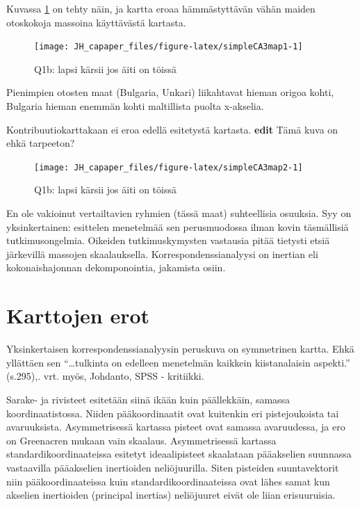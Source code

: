 \documentclass[
  finnish,
]{book}
\begin{document}
Kuvassa \ref{fig:simpleCA3map1} on tehty näin, ja kartta eroaa hämmästyttävän
vähän maiden otoskokoja massoina käyttävästä kartasta.

\begin{figure}

{\centering \texttt{[image: JH\_capaper\_files/figure-latex/simpleCA3map1-1]} 

}

\caption{Q1b: lapsi kärsii jos äiti on töissä}\label{fig:simpleCA3map1}
\end{figure}

Pienimpien otosten maat (Bulgaria, Unkari) liikahtavat hieman origoa kohti,
Bulgaria hieman enemmän kohti maltillista puolta x-akselia.

Kontribuutiokarttakaan ei eroa edellä esitetystä kartasta.
\textbf{edit} Tämä kuva on ehkä tarpeeton?

\begin{figure}

{\centering \texttt{[image: JH\_capaper\_files/figure-latex/simpleCA3map2-1]} 

}

\caption{Q1b: lapsi kärsii jos äiti on töissä}\label{fig:simpleCA3map2}
\end{figure}

En ole vakioinut vertailtavien ryhmien (tässä maat) suhteellisia osuuksia. Syy on
yksinkertainen: esittelen menetelmää sen perusmuodossa ilman kovin täsmällisiä
tutkimusongelmia. Oikeiden tutkimuskymysten vastausia pitää tietysti etsiä järkevillä
massojen skaalauksella. Korrespondenssianalyysi on inertian eli kokonaishajonnan
dekomponointia, jakamista osiin.

\hypertarget{karttojen-erot}{%
\section{Karttojen erot}\label{karttojen-erot}}

Yksinkertaisen korrespondenssianalyysin peruskuva on symmetrinen kartta. Ehkä
yllättäen sen ``\ldots tulkinta on edelleen menetelmän kaikkein kiistanalaisin aspekti.''
\citep{RefWorks:doc:5a857a43e4b0ed2d44664d78} (s.295),\citep{RefWorks:doc:5c768b09e4b02df9431e950a}.
vrt. myös, Johdanto, SPSS - kritiikki.

Sarake- ja rivisteet esitetään siinä ikään kuin päällekkäin, samassa koordinaatistossa.
Niiden pääkoordinaatit ovat kuitenkin eri pistejoukoista tai avaruuksista. Asymmetrisessä
kartassa pisteet ovat samassa avaruudessa, ja ero on Greenacren mukaan vain skaalaus.
Asymmetrisessä kartassa standardikoordinaateissa esitetyt ideaalipisteet skaalataan
pääakselien suunnassa vastaavilla pääakselien inertioiden neliöjuurilla. Siten pisteiden
suuntavektorit niin pääkoordinaateissa kuin standardikoordinaateissa ovat lähes samat
kun akselien inertioiden (principal inertias) neliöjuuret eivät ole liian erisuuruisia.
\end{document}
